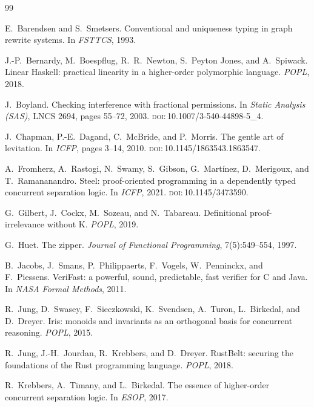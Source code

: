 \documentclass[11pt,a4paper]{article}
\theoremstyle{definition}
\theoremstyle{plain}
\newcommand{\doi}[1]{\textsc{doi}:\,#1}
\begin{document}
\begin{thebibliography}{99}\small

E.~Barendsen and S.~Smetsers.
\newblock Conventional and uniqueness typing in graph rewrite systems.
\newblock In \emph{FSTTCS}, 1993.

J.-P.~Bernardy, M.~Boespflug, R.~R.~Newton, S.~Peyton Jones, and A.~Spiwack.
\newblock Linear Haskell: practical linearity in a higher-order polymorphic
language.
\newblock \emph{POPL}, 2018.

J.~Boyland.
\newblock Checking interference with fractional permissions.
\newblock In \emph{Static Analysis (SAS)}, LNCS 2694, pages 55--72, 2003.
\newblock \doi{10.1007/3-540-44898-5\_4}.

J.~Chapman, P.-E.~Dagand, C.~McBride, and P.~Morris.
\newblock The gentle art of levitation.
\newblock In \emph{ICFP}, pages 3--14, 2010.
\newblock \doi{10.1145/1863543.1863547}.

A.~Fromherz, A.~Rastogi, N.~Swamy, S.~Gibson, G.~Mart\'inez, D.~Merigoux, and
T.~Ramananandro.
\newblock Steel: proof-oriented programming in a dependently typed concurrent
separation logic.
\newblock In \emph{ICFP}, 2021.
\newblock \doi{10.1145/3473590}.

G.~Gilbert, J.~Cockx, M.~Sozeau, and N.~Tabareau.
\newblock Definitional proof-irrelevance without K.
\newblock \emph{POPL}, 2019.

G.~Huet.
\newblock The zipper.
\newblock \emph{Journal of Functional Programming}, 7(5):549--554, 1997.

B.~Jacobs, J.~Smans, P.~Philippaerts, F.~Vogels, W.~Penninckx, and
F.~Piessens.
\newblock VeriFast: a powerful, sound, predictable, fast verifier for C and
Java.
\newblock In \emph{NASA Formal Methods}, 2011.

R.~Jung, D.~Swasey, F.~Sieczkowski, K.~Svendsen, A.~Turon, L.~Birkedal, and
D.~Dreyer.
\newblock Iris: monoids and invariants as an orthogonal basis for concurrent
reasoning.
\newblock \emph{POPL}, 2015.

R.~Jung, J.-H.~Jourdan, R.~Krebbers, and D.~Dreyer.
\newblock RustBelt: securing the foundations of the Rust programming language.
\newblock \emph{POPL}, 2018.

R.~Krebbers, A.~Timany, and L.~Birkedal.
\newblock The essence of higher-order concurrent separation logic.
\newblock In \emph{ESOP}, 2017.


\end{thebibliography}
\end{document}
